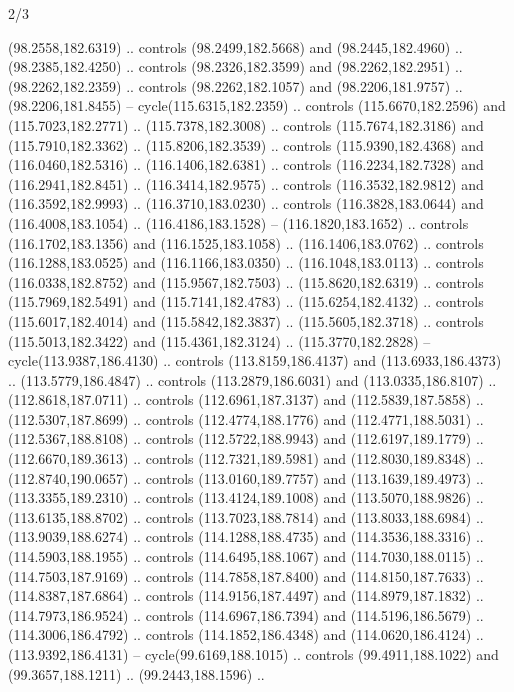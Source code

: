 \begin{flagdescription}{2/3}
\begin{scope}[shift={(0.5\flaglength,0.5)},scale=\flagwidth/320]
\begin{scope}[y=0.8pt, x=0.8pt, yscale=-1,shift={(-118.3,-146)}]
  (98.2558,182.6319) .. controls (98.2499,182.5668) and (98.2445,182.4960) ..
  (98.2385,182.4250) .. controls (98.2326,182.3599) and (98.2262,182.2951) ..
  (98.2262,182.2359) .. controls (98.2262,182.1057) and (98.2206,181.9757) ..
  (98.2206,181.8455) -- cycle(115.6315,182.2359) .. controls (115.6670,182.2596)
  and (115.7023,182.2771) .. (115.7378,182.3008) .. controls (115.7674,182.3186)
  and (115.7910,182.3362) .. (115.8206,182.3539) .. controls (115.9390,182.4368)
  and (116.0460,182.5316) .. (116.1406,182.6381) .. controls (116.2234,182.7328)
  and (116.2941,182.8451) .. (116.3414,182.9575) .. controls (116.3532,182.9812)
  and (116.3592,182.9993) .. (116.3710,183.0230) .. controls (116.3828,183.0644)
  and (116.4008,183.1054) .. (116.4186,183.1528) -- (116.1820,183.1652) ..
  controls (116.1702,183.1356) and (116.1525,183.1058) .. (116.1406,183.0762) ..
  controls (116.1288,183.0525) and (116.1166,183.0350) .. (116.1048,183.0113) ..
  controls (116.0338,182.8752) and (115.9567,182.7503) .. (115.8620,182.6319) ..
  controls (115.7969,182.5491) and (115.7141,182.4783) .. (115.6254,182.4132) ..
  controls (115.6017,182.4014) and (115.5842,182.3837) .. (115.5605,182.3718) ..
  controls (115.5013,182.3422) and (115.4361,182.3124) .. (115.3770,182.2828) --
  cycle(113.9387,186.4130) .. controls (113.8159,186.4137) and
  (113.6933,186.4373) .. (113.5779,186.4847) .. controls (113.2879,186.6031) and
  (113.0335,186.8107) .. (112.8618,187.0711) .. controls (112.6961,187.3137) and
  (112.5839,187.5858) .. (112.5307,187.8699) .. controls (112.4774,188.1776) and
  (112.4771,188.5031) .. (112.5367,188.8108) .. controls (112.5722,188.9943) and
  (112.6197,189.1779) .. (112.6670,189.3613) .. controls (112.7321,189.5981) and
  (112.8030,189.8348) .. (112.8740,190.0657) .. controls (113.0160,189.7757) and
  (113.1639,189.4973) .. (113.3355,189.2310) .. controls (113.4124,189.1008) and
  (113.5070,188.9826) .. (113.6135,188.8702) .. controls (113.7023,188.7814) and
  (113.8033,188.6984) .. (113.9039,188.6274) .. controls (114.1288,188.4735) and
  (114.3536,188.3316) .. (114.5903,188.1955) .. controls (114.6495,188.1067) and
  (114.7030,188.0115) .. (114.7503,187.9169) .. controls (114.7858,187.8400) and
  (114.8150,187.7633) .. (114.8387,187.6864) .. controls (114.9156,187.4497) and
  (114.8979,187.1832) .. (114.7973,186.9524) .. controls (114.6967,186.7394) and
  (114.5196,186.5679) .. (114.3006,186.4792) .. controls (114.1852,186.4348) and
  (114.0620,186.4124) .. (113.9392,186.4131) -- cycle(99.6169,188.1015) ..
  controls (99.4911,188.1022) and (99.3657,188.1211) .. (99.2443,188.1596) ..

\end{scope}
\end{scope}
\end{flagdescription}
